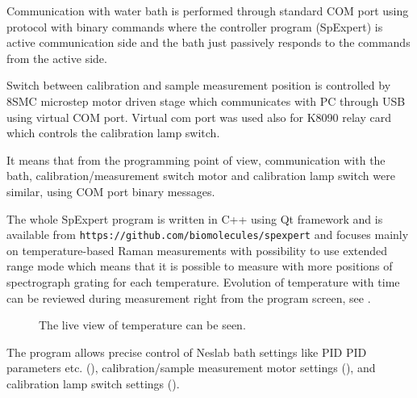 Communication with water bath is performed through standard COM port using
protocol with binary commands where the controller program (SpExpert) is
active communication side and the bath just passively responds to the
commands from the active side.

Switch between calibration and sample measurement position is controlled by
8SMC microstep motor driven stage which communicates with PC through USB
using virtual COM port.
Virtual com port was used also for K8090 relay card which controls the
calibration lamp switch.

It means that from the programming point of view, communication with the
bath, calibration/measurement switch motor and calibration lamp switch were
similar, using COM port binary messages.

The whole SpExpert program is written in C++ using Qt framework and is
available from
\texttt{https://github.com/biomolecules/spexpert} and focuses mainly on
temperature-based Raman measurements with possibility to use extended range
mode which means that it is possible to measure with more positions of
spectrograph grating for each temperature.
Evolution of temperature with time can be reviewed during measurement right
from the program screen, see
.

\begin{figure}
	\centering
	\caption[%
			SpExpert program during temperature dependent mesurement.
	]{%
		The live view of temperature can be seen.}
	\label{\figlabel{spex_automation:temperature_measurement}}
\end{figure}

The program allows precise control of Neslab bath settings like PID
PID parameters etc.
(),
calibration/sample measurement motor settings
(),
and calibration lamp switch settings
().

\begin{figure}
	\centering
	\caption[%
			Settings of Neslab bath available from SpExpert program.
	]{%
		}
	\label{\figlabel{spex_automation:neslabus}}
\end{figure}

